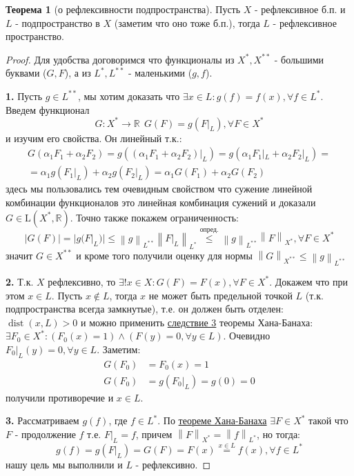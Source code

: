 \documentclass[12pt,a4paper]{article}
\theoremstyle{definition}
\newtheorem{theorem}{Теорема}
\newcommand{\Real}{\mathbb{R}}
\newcommand{\norm}[1]{\left\lVert#1\right\rVert}
\DeclareMathOperator{\dist}{dist}
\newcommand{\linear}[2]{\textrm{L}(#1, #2)}
\begin{document}
\begin{theorem}[о рефлексивности подпространства]
	Пусть $X$ - рефлексивное б.п. и $L$ - подпространство в $X$ (заметим что оно тоже б.п.), тогда $L$ - рефлексивное пространство.
\end{theorem}
\begin{proof}
	Для удобства договоримся что функционалы из $X^*, X^{**}$ - большими буквами ($G, F$), а из $L^*, L^{**}$ - маленькими ($g, f$).
	
	\textbf{1.} Пусть $g \in L^{**}$, мы хотим доказать что $\exists x \in L: g(f) = f(x), \forall f \in L^*$. Введем функционал 
	$$G: X^* \to \Real \ \ G(F) = g(F|_L), \forall F \in X^*$$
	и изучим его свойства. Он линейный т.к.:
	\begin{multline*}
		G(\alpha_1 F_1 +\alpha_2 F_2) = g((\alpha_1 F_1 + \alpha_2 F_2)|_L) = g(\alpha_1 F_1|_L + \alpha_2 F_2 |_L) = \\ = \alpha_1 g(F_1|_L) + \alpha_2 g(F_2|_L) = \alpha_1 G(F_1) + \alpha_2 G(F_2)
	\end{multline*}
	здесь мы пользовались тем очевидным свойством что сужение линейной комбинации функционалов это линейная комбинация сужений и доказали $G \in \linear{X^*}{\Real}$. Точно также покажем ограниченность:
	$$|G(F)| = |g(F|_L)| \leq \norm{g}_{L^{**}} \norm{F|_L}_{L^*} \overset{\hyperref[corll:3]{\text{опред.}}}{\leq} \norm{g}_{L^{**}} \norm{F}_{X^*}, \forall F \in X^*$$
	значит $G \in X^{**}$ и кроме того получили оценку для нормы $\norm{G}_{X^{**}} \leq \norm{g}_{L^{**}}$
	
	\textbf{2.} Т.к. $X$ рефлексивно, то $\exists! x \in X: G(F) = F(x), \forall F \in X^*$. Докажем что при этом $x \in L$. Пусть $x \notin L$, тогда $x$ не может быть предельной точкой $L$ (т.к. подпространства всегда замкнутые), т.е. он должен быть отделен: $\dist(x, L) > 0$ и можно применить \hyperref[corll:4]{следствие 3} теоремы Хана-Банаха: $\exists F_0 \in X^*: (F_0 (x) = 1) \wedge (F(y) = 0, \forall y \in L)$. Очевидно $F_0 |_L (y) = 0, \forall y \in L$. Заметим:
	\begin{align*}
		G(F_0) &= F_0 (x) = 1 \\
		G(F_0) &= g(F_0 |_L) = g(0) = 0
	\end{align*}
	получили противоречие и $x \in L$.
	
	\textbf{3.} Рассматриваем $g(f)$, где $f \in L^*$. По \hyperref[th:1]{теореме Хана-Банаха} $\exists F \in X^*$ такой что $F$ - продолжение $f$ т.е. $F|_L = f$, причем $\norm{F}_{X^*} = \norm{f}_{L^*}$, но тогда:
	$$g(f) = g(F|_L) = G(F) = F(x) \overset{x \in L}{=} f(x), \forall f \in L^*$$
	нашу цель мы выполнили и $L$ - рефлексивно.
\end{proof}
\end{document}
